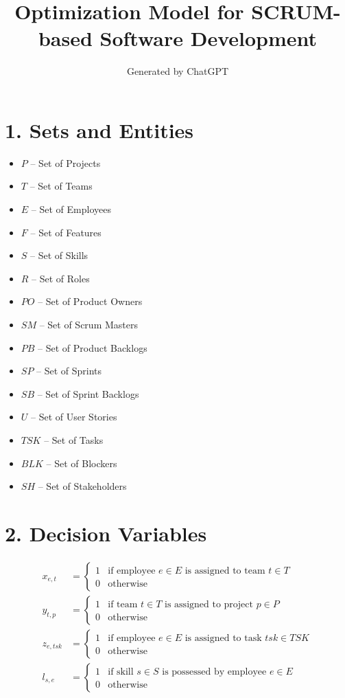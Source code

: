 \documentclass{article}
\title{Optimization Model for SCRUM-based Software Development}
\author{Generated by ChatGPT}
\date{}
\begin{document}
\maketitle

\section*{1. Sets and Entities}
\begin{itemize}
    \item $P$ – Set of Projects
    \item $T$ – Set of Teams
    \item $E$ – Set of Employees
    \item $F$ – Set of Features
    \item $S$ – Set of Skills
    \item $R$ – Set of Roles
    \item $PO$ – Set of Product Owners
    \item $SM$ – Set of Scrum Masters
    \item $PB$ – Set of Product Backlogs
    \item $SP$ – Set of Sprints
    \item $SB$ – Set of Sprint Backlogs
    \item $U$ – Set of User Stories
    \item $TSK$ – Set of Tasks
    \item $BLK$ – Set of Blockers
    \item $SH$ – Set of Stakeholders
\end{itemize}

\section*{2. Decision Variables}
\begin{align*}
x_{e,t} &=
\begin{cases}
1 & \text{if employee } e \in E \text{ is assigned to team } t \in T \\
0 & \text{otherwise}
\end{cases} \\
y_{t,p} &=
\begin{cases}
1 & \text{if team } t \in T \text{ is assigned to project } p \in P \\
0 & \text{otherwise}
\end{cases} \\
z_{e,tsk} &=
\begin{cases}
1 & \text{if employee } e \in E \text{ is assigned to task } tsk \in TSK \\
0 & \text{otherwise}
\end{cases} \\
l_{s,e} &=
\begin{cases}
1 & \text{if skill } s \in S \text{ is possessed by employee } e \in E \\
0 & \text{otherwise}
\end{cases}
\end{align*}
\end{document}
